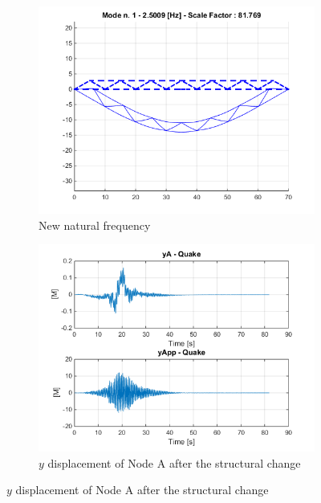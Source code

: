 \documentclass[10pt,a4paper,final]{report}
\begin{document}
\begin{figure}[h]
        \centering
        \begin{subfigure}[t]{0.5\textwidth}
                \includegraphics[width=\textwidth]{structuralchangeb1}
                \caption{New natural frequency}
                \label{fig:newqfreqb}
        \end{subfigure}%
        \begin{subfigure}[t]{0.5\textwidth}
                \includegraphics[width=\textwidth]{structuralchangeb2}
                \caption{$y$ displacement of Node A after the structural change}
                \label{fig:newquakeb}
        \end{subfigure}
         \label{fig:newa}
\end{figure}
\end{document}

